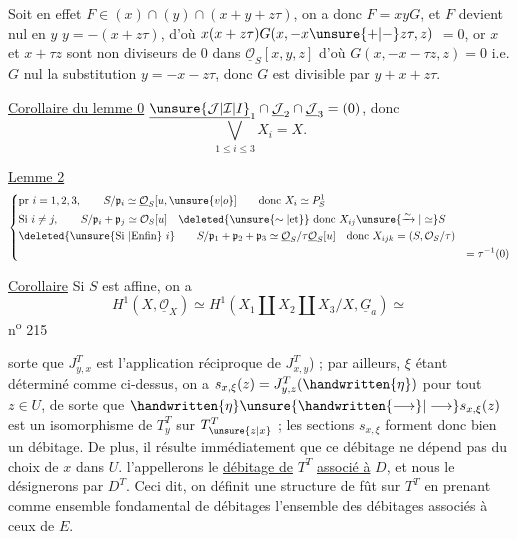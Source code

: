 Soit en effet $F\in(x)\cap(y)\cap(x+y+z\tau)$, on a donc $F=xyG$, et $F$ devient nul en $y$  $y=-(x+z\tau)$, d'où $x(x+z\tau)G(x,-x\unsure{+|-}z\tau,z)$ $=0$, or $x$ et $x+\tau z$ sont non diviseurs de $0$ dans $\underline{\mathcal O}_S[x,y,z]$   d'où $G(x,-x-\tau z,z)=0$ i.e. $G$   nul  la substitution $y=-x-z\tau$, donc $G$ est divisible par $y+x+z\tau$.

\uline{Corollaire du lemme 0} $\underline{\unsure{\mathcal J|\mathcal I|I}}_1\cap\underline{\mathcal J}_2\cap\underline{\mathcal J}_3=(0)$, donc
\[
\bigvee_{1\le i\le3}X_i=X.
\]

\uline{Lemme 2}  
\[
\left\{\begin{aligned}
&\text{pr }i=1,2,3,\qquad S/\mathfrak p_i\simeq\underline{\mathcal O}_S[u,\unsure{v|o}]\qquad\text{donc }X_i\simeq P^1_S\\
&\text{Si }i\ne j,\qquad S/\mathfrak p_i+\mathfrak p_j\simeq\mathcal O_S[u]\quad\deleted{\unsure{\sim|\text{et}}}\ \text{donc }X_{ij}\unsure{\xrightarrow{\sim}|\simeq} S\\
&\deleted{\text{\unsure{Si |Enfin} }i}\qquad S/\mathfrak p_1+\mathfrak p_2+\mathfrak p_3\simeq\underline{\mathcal O}_S/\tau\underline{\mathcal O}_S[u]\quad\text{donc }X_{ijk}=(S,\mathcal O_S/\tau)\\
&&=\tau^{-1}(0)
\end{aligned}\right.
\]

\uline{Corollaire} Si $S$ est affine, on a
\[
H^1(X,\underline{\mathcal O}_X)\simeq H^1(X_1\amalg X_2\amalg X_3/X,\underline G_a)\simeq
\]
n\textsuperscript{o} 215

sorte que $J^T_{y,x}$ est l'application réciproque de $J^T_{x,y}$) ; par ailleurs, $\xi$ étant déterminé comme ci-dessus, on a $s_{x,\xi}(z)=J^T_{y,z}(\handwritten{\eta})$ pour tout $z\in U$, de sorte que $\handwritten{\eta}\unsure{\handwritten{\longrightarrow}|\longrightarrow} s_{x,\xi}(z)$ est un isomorphisme de $T_y^T$ sur $T_{\unsure{z|x}}^T$ ; les sections $s_{x,\xi}$ forment donc bien un débitage. De plus, il résulte immédiatement que ce débitage ne dépend pas du choix de $x$ dans $U$.  l'appellerons le \uline{débitage de} $T^T$ \uline{associé à} $D$, et nous le désignerons par $D^T$. Ceci dit, on définit une structure de fût sur $T^T$ en prenant comme ensemble fondamental de débitages l'ensemble des débitages associés à ceux de $E$.

